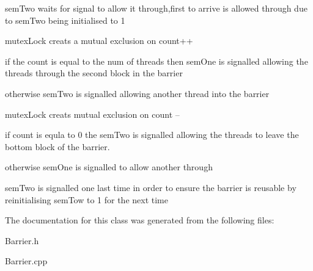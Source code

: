 sem\+Two waits for signal to allow it through,first to arrive is allowed through due to sem\+Two being initialised to 1

mutex\+Lock creats a mutual exclusion on count++

if the count is equal to the num of threads then sem\+One is signalled allowing the threads through the second block in the barrier

otherwise sem\+Two is signalled allowing another thread into the barrier

mutex\+Lock creats mutual exclusion on count --

if count is equla to 0 the sem\+Two is signalled allowing the threads to leave the bottom block of the barrier.

otherwise sem\+One is signalled to allow another through

sem\+Two is signalled one last time in order to ensure the barrier is reusable by reinitialising sem\+Tow to 1 for the next time 

The documentation for this class was generated from the following files\+:\begin{DoxyCompactItemize}
\item 
Barrier.\+h\item 
Barrier.\+cpp\end{DoxyCompactItemize}
